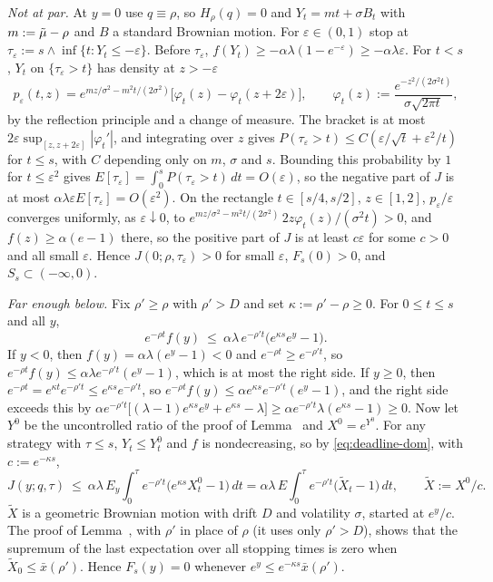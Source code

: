 \emph{Not at par.} At $y=0$ use $q\equiv\rho$, so $H_\rho(q)=0$ and $Y_t=mt+\sigma B_t$ with $m:=\tilde\mu-\rho$ and $B$ a standard Brownian motion. For $\varepsilon\in(0,1)$ stop at $\tau_\varepsilon:=s\wedge\inf\{t:Y_t\le-\varepsilon\}$. Before $\tau_\varepsilon$, $f(Y_t)\ge-\alpha\lambda(1-e^{-\varepsilon})\ge-\alpha\lambda\varepsilon$. For $t<s$, $Y_t$ on $\{\tau_\varepsilon>t\}$ has density at $z>-\varepsilon$
\[
p_\varepsilon(t,z)=e^{mz/\sigma^2-m^2t/(2\sigma^2)}\big[\varphi_t(z)-\varphi_t(z+2\varepsilon)\big],\qquad \varphi_t(z):=\frac{e^{-z^2/(2\sigma^2t)}}{\sigma\sqrt{2\pi t}},
\]
by the reflection principle and a change of measure. The bracket is at most $2\varepsilon\sup_{[z,z+2\varepsilon]}|\varphi_t'|$, and integrating over $z$ gives $P(\tau_\varepsilon>t)\le C(\varepsilon/\sqrt t+\varepsilon^2/t)$ for $t\le s$, with $C$ depending only on $m$, $\sigma$ and $s$. Bounding this probability by $1$ for $t\le\varepsilon^2$ gives $E[\tau_\varepsilon]=\int_0^sP(\tau_\varepsilon>t)\,dt=O(\varepsilon)$, so the negative part of $J$ is at most $\alpha\lambda\varepsilon E[\tau_\varepsilon]=O(\varepsilon^2)$. On the rectangle $t\in[s/4,s/2]$, $z\in[1,2]$, $p_\varepsilon/\varepsilon$ converges uniformly, as $\varepsilon\downarrow0$, to $e^{mz/\sigma^2-m^2t/(2\sigma^2)}\,2z\varphi_t(z)/(\sigma^2t)>0$, and $f(z)\ge\alpha(e-1)$ there, so the positive part of $J$ is at least $c\varepsilon$ for some $c>0$ and all small $\varepsilon$. Hence $J(0;\rho,\tau_\varepsilon)>0$ for small $\varepsilon$, $F_s(0)>0$, and $S_s\subset(-\infty,0)$.

\emph{Far enough below.} Fix $\rho'\ge\rho$ with $\rho'>D$ and set $\kappa:=\rho'-\rho\ge0$. For $0\le t\le s$ and all $y$,
\begin{equation}
e^{-\rho t}f(y)\ \le\ \alpha\lambda\,e^{-\rho' t}\big(e^{\kappa s}e^y-1\big). \label{eq:deadline-dom}
\end{equation}
If $y<0$, then $f(y)=\alpha\lambda(e^y-1)<0$ and $e^{-\rho t}\ge e^{-\rho't}$, so $e^{-\rho t}f(y)\le\alpha\lambda e^{-\rho't}(e^y-1)$, which is at most the right side. If $y\ge0$, then $e^{-\rho t}=e^{\kappa t}e^{-\rho't}\le e^{\kappa s}e^{-\rho't}$, so $e^{-\rho t}f(y)\le\alpha e^{\kappa s}e^{-\rho't}(e^y-1)$, and the right side exceeds this by $\alpha e^{-\rho't}\big[(\lambda-1)e^{\kappa s}e^y+e^{\kappa s}-\lambda\big]\ge\alpha e^{-\rho't}\lambda(e^{\kappa s}-1)\ge0$. Now let $Y^0$ be the uncontrolled ratio of the proof of Lemma~ and $X^0=e^{Y^0}$. For any strategy with $\tau\le s$, $Y_t\le Y^0_t$ and $f$ is nondecreasing, so by \eqref{eq:deadline-dom}, with $c:=e^{-\kappa s}$,
\[
J(y;q,\tau)\ \le\ \alpha\lambda\,E_y\!\int_0^\tau e^{-\rho't}\big(e^{\kappa s}X^0_t-1\big)\,dt
=\alpha\lambda\,E\!\int_0^\tau e^{-\rho't}\big(\tilde X_t-1\big)\,dt,\qquad \tilde X:=X^0/c .
\]
$\tilde X$ is a geometric Brownian motion with drift $D$ and volatility $\sigma$, started at $e^y/c$. The proof of Lemma~, with $\rho'$ in place of $\rho$ (it uses only $\rho'>D$), shows that the supremum of the last expectation over all stopping times is zero when $\tilde X_0\le\bar x(\rho')$. Hence $F_s(y)=0$ whenever $e^y\le e^{-\kappa s}\bar x(\rho')$.

